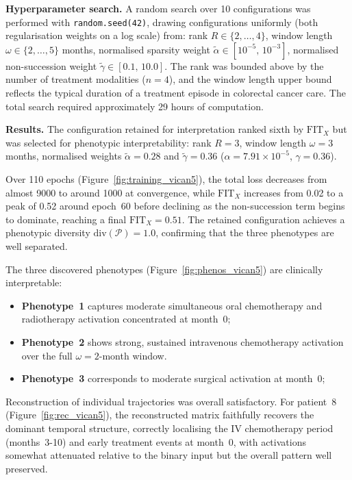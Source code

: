 \documentclass[a4paper]{cas-sc}
\begin{document}
\textbf{Hyperparameter search.}
A random search over 10 configurations was performed with \texttt{random.seed(42)}, drawing configurations uniformly (both regularisation weights on a log scale) from: rank $R \in \{2, \ldots, 4\}$, window length $\omega \in \{2, \ldots, 5\}$ months, normalised sparsity weight $\tilde{\alpha} \in [10^{-5},\, 10^{-3}]$, normalised non-succession weight $\tilde{\gamma} \in [0.1,\, 10.0]$. 
The rank was bounded above by the number of treatment modalities ($n = 4$), and the window length upper bound reflects the typical duration of a treatment episode in colorectal cancer care. 
The total search required approximately 29 hours of computation.

\textbf{Results.}
The configuration retained for interpretation ranked sixth by $\text{FIT}_X$ but was selected for phenotypic interpretability: rank $R = 3$, window length $\omega = 3$ months, normalised weights $\tilde{\alpha} = 0.28$ and $\tilde{\gamma} = 0.36$ ($\alpha = 7.91 \times 10^{-5}$, $\gamma = 0.36$).
 
Over 110 epochs (Figure~\ref{fig:training_vican5}), the total loss decreases from almost 9000 to around 1000 at convergence, while $\text{FIT}_X$ increases from 0.02 to a peak of 0.52 around epoch~60 before declining as the non-succession term begins to dominate, reaching a final $\text{FIT}_X = 0.51$. 
The retained configuration achieves a phenotypic diversity $\text{div}(\mathcal{P}) = 1.0$, confirming that the three phenotypes are well separated.
 
The three discovered phenotypes (Figure~\ref{fig:phenos_vican5}) are clinically interpretable: 
\begin{itemize}
  \item \textbf{Phenotype~1} captures moderate simultaneous oral chemotherapy and radiotherapy activation concentrated at month~0; 
  \item \textbf{Phenotype~2} shows strong, sustained intravenous chemotherapy activation over the full $\omega = 2$-month window.
  \item \textbf{Phenotype~3} corresponds to moderate surgical activation at month~0; 
\end{itemize}

Reconstruction of individual trajectories was overall satisfactory. 
For patient~8 (Figure~\ref{fig:rec_vican5}), the reconstructed matrix faithfully recovers the dominant temporal structure, correctly localising the IV chemotherapy period (months~3-10) and early treatment events at month~0, with activations somewhat attenuated relative to the binary input but the overall pattern well preserved.
\end{document}
